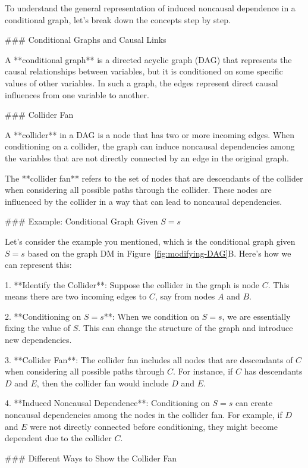 To understand the general representation of induced noncausal dependence in a conditional graph, let's break down the concepts step by step.

### Conditional Graphs and Causal Links

A **conditional graph** is a directed acyclic graph (DAG) that represents the causal relationships between variables, but it is conditioned on some specific values of other variables. In such a graph, the edges represent direct causal influences from one variable to another.

### Collider Fan

A **collider** in a DAG is a node that has two or more incoming edges. When conditioning on a collider, the graph can induce noncausal dependencies among the variables that are not directly connected by an edge in the original graph.

The **collider fan** refers to the set of nodes that are descendants of the collider when considering all possible paths through the collider. These nodes are influenced by the collider in a way that can lead to noncausal dependencies.

### Example: Conditional Graph Given \( S = s \)

Let's consider the example you mentioned, which is the conditional graph given \( S = s \) based on the graph DM in Figure~\ref{fig:modifying-DAG}B. Here’s how we can represent this:

1. **Identify the Collider**: Suppose the collider in the graph is node \( C \). This means there are two incoming edges to \( C \), say from nodes \( A \) and \( B \).

2. **Conditioning on \( S = s \)**: When we condition on \( S = s \), we are essentially fixing the value of \( S \). This can change the structure of the graph and introduce new dependencies.

3. **Collider Fan**: The collider fan includes all nodes that are descendants of \( C \) when considering all possible paths through \( C \). For instance, if \( C \) has descendants \( D \) and \( E \), then the collider fan would include \( D \) and \( E \).

4. **Induced Noncausal Dependence**: Conditioning on \( S = s \) can create noncausal dependencies among the nodes in the collider fan. For example, if \( D \) and \( E \) were not directly connected before conditioning, they might become dependent due to the collider \( C \).

### Different Ways to Show the Collider Fan


